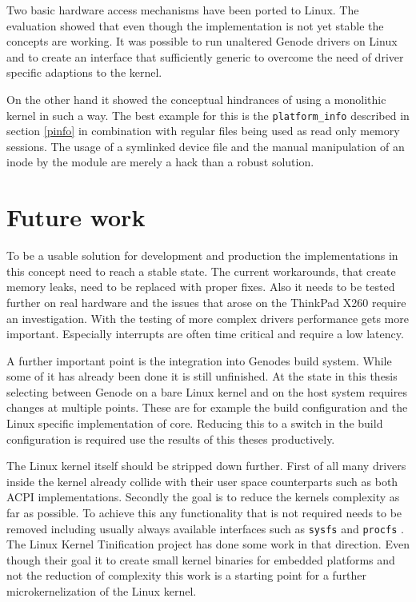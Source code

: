 \documentclass[
a4paper,
12pt,
notitlepage,
parskip=half,
DIV=11,
]{scrbook}
\begin{document}
		Two basic hardware access mechanisms have been ported to Linux.
		The evaluation showed that even though the implementation is not yet stable the concepts are working.
		It was possible to run unaltered Genode drivers on Linux and to create an interface that sufficiently generic to overcome the need of driver specific adaptions to the kernel.
		
		On the other hand it showed the conceptual hindrances of using a monolithic kernel in such a way.
		The best example for this is the \texttt{platform\_info} described in section \ref{pinfo} in combination with regular files being used as read only memory sessions.
		The usage of a symlinked device file and the manual manipulation of an inode by the module are merely a hack than a robust solution.
	
		\section{Future work}
		
		To be a usable solution for development and production the implementations in this concept need to reach a stable state.
		The current workarounds, that create memory leaks, need to be replaced with proper fixes.
		Also it needs to be tested further on real hardware and the issues that arose on the ThinkPad X260 require an investigation.
		With the testing of more complex drivers performance gets more important.
		Especially interrupts are often time critical and require a low latency.
		
		A further important point is the integration into Genodes build system.
		While some of it has already been done it is still unfinished.
		At the state in this thesis selecting between Genode on a bare Linux kernel and on the host system requires changes at multiple points.
		These are for example the build configuration and the Linux specific implementation of core.
		Reducing this to a switch in the build configuration is required use the results of this theses productively.
		
		The Linux kernel itself should be stripped down further.
		First of all many drivers inside the kernel already collide with their user space counterparts such as both ACPI implementations.
		Secondly the goal is to reduce the kernels complexity as far as possible.
		To achieve this any functionality that is not required needs to be removed including usually always available interfaces such as \texttt{sysfs} \citep{sysfs} and \texttt{procfs} \citep{procfs}.
		The Linux Kernel Tinification project \citep{tiny} has done some work in that direction.
		Even though their goal it to create small kernel binaries for embedded platforms and not the reduction of complexity this work is a starting point for a further microkernelization of the Linux kernel.
	
	
	
	
\end{document}
